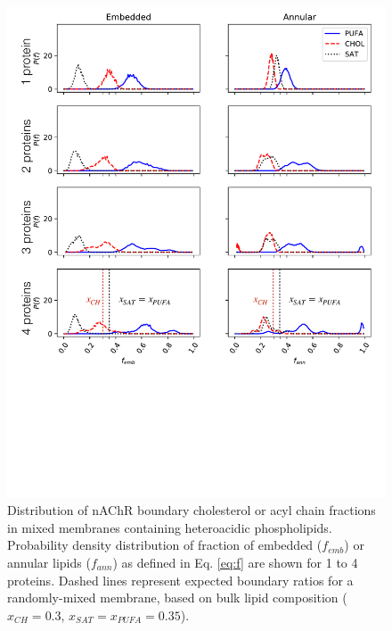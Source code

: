 \begin{figure}[htp]
\includegraphics[width=\textwidth]{figure/figure4.pdf}
\caption[Distribution of nAChR boundary cholesterol or acyl chain fractions in mixed membranes containing heteroacidic phospholipids.] {Distribution of nAChR boundary cholesterol or acyl chain fractions in mixed membranes containing heteroacidic phospholipids. Probability density distribution of fraction of embedded ($f_{emb}$) or annular lipids ($f_{ann}$) as defined in Eq. \ref{eq:f} are shown for 1 to 4 proteins.  Dashed lines represent expected boundary ratios for a randomly-mixed membrane, based on bulk lipid composition ($x_{CH} = 0.3$, $x_{SAT}=x_{PUFA}= 0.35$).}\label{fig:Fig2b}
\end{figure}



